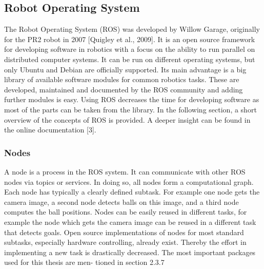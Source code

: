 \subsection{Robot Operating System}
The Robot Operating System (ROS) was developed by Willow Garage,  originally
for  the  PR2  robot  in  2007  [Quigley et al., 2009].   It  is  an  open  source  framework
for  developing  software  in  robotics  with  a  focus  on  the  ability  to  run  parallel  on
distributed  computer  systems.   It  can  be  run  on  different  operating  systems,  but
only Ubuntu and Debian are officially supported.  Its main advantage is a big library
of  available  software  modules  for  common  robotics  tasks.   These  are  developed,
maintained and documented by the ROS community and adding further modules is
easy.  Using ROS decreases the time for developing software as most of the parts can
be taken from the library.  In the following section, a short overview of the concepts
of ROS is provided.  A deeper insight can be found in the online documentation [3].

\subsubsection*{Nodes}
A node is a process in the ROS system.  It can communicate with other ROS nodes
via  topics  or  services.   In  doing  so,  all  nodes  form  a  computational  graph.   Each
node has typically a clearly defined subtask.  For example one node gets the camera
image, a second node detects balls on this image, and a third node computes the
ball positions.  Nodes can be easily reused in different tasks, for example the node
which gets the camera image can be reused in a different task that detects goals.
Open  source  implementations  of  nodes  for  most  standard  subtasks,  especially
hardware controlling, already exist.  Thereby the effort in implementing a new task
is drastically decreased.  The most important packages used for this thesis are men-
tioned in section 2.3.7

